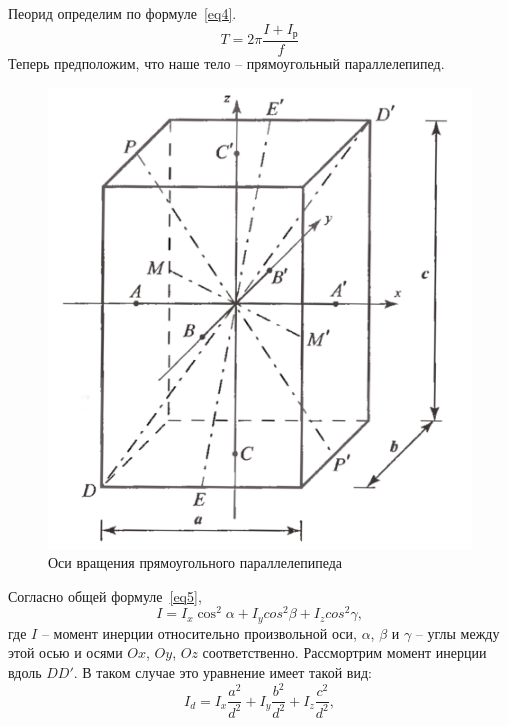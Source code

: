 \documentclass[a4paper,11pt]{article}
\begin{document}
Пеорид определим по формуле~\ref{eq4}.\newline
\begin{equation}    \label{eq4}
  T = 2 \pi \frac{I+I_{р}}{f}
\end{equation}
Теперь предположим, что наше тело -- прямоугольный параллелепипед.\newline
\begin{figure}
  \includegraphics[scale = 0.6]{параллелепипед.png}
  \caption{Оси вращения прямоугольного параллелепипеда}
  \label{fig:img1}
\end{figure}
Согласно общей формуле~\ref{eq5},
\begin{equation}    \label{eq5}
  I = I_{x}\cos^{2}\alpha + I_{y}cos^{2}\beta + I_{z}cos^{2}\gamma,
\end{equation}
где $I$ -- момент инерции относительно произвольной оси, $\alpha$, $\beta$ и $\gamma$ -- углы между этой осью и осями $Ox$, $Oy$, $Oz$ соответственно.\newline
Рассмортрим момент инерции вдоль $DD'$. В таком случае это уравнение имеет такой вид:
\begin{equation}    \label{eq6}
I_{d} = I_{x}\frac{a^{2}}{d^{2}} + I_{y}\frac{b^{2}}{d^{2}} + I_{z}\frac{c^{2}}{d^{2}},
\end{equation}
\end{document}
